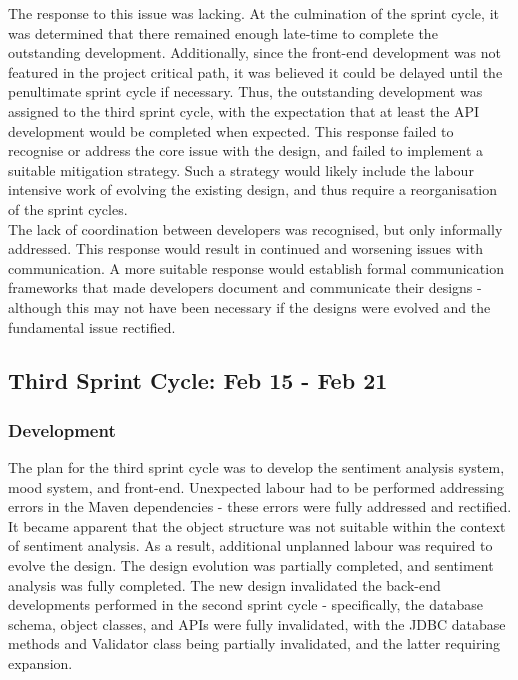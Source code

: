 \documentclass[9pt, titlepage]{extarticle}
\begin{document}
The response to this issue was lacking. At the culmination of the sprint cycle, it was determined that there remained enough late-time to complete the outstanding development. Additionally, since the front-end development was not featured in the project critical path, it was believed it could be delayed until the penultimate sprint cycle if necessary. Thus, the outstanding development was assigned to the third sprint cycle, with the expectation that at least the API development would be completed when expected. This response failed to recognise or address the core issue with the design, and failed to implement a suitable mitigation strategy. Such a strategy would likely include the labour intensive work of evolving the existing design, and thus require a reorganisation of the sprint cycles.\\

The lack of coordination between developers was recognised, but only informally addressed. This response would result in continued and worsening issues with communication. A more suitable response would establish formal communication frameworks that made developers document and communicate their designs - although this may not have been necessary if the designs were evolved and the fundamental issue rectified.

\subsection{Third Sprint Cycle: Feb 15 - Feb 21}

\subsubsection{Development}

The plan for the third sprint cycle was to develop the sentiment analysis system, mood system, and front-end. Unexpected labour had to be performed addressing errors in the Maven dependencies - these errors were fully addressed and rectified. It became apparent that the object structure was not suitable within the context of sentiment analysis. As a result, additional unplanned labour was required to evolve the design. The design evolution was partially completed, and sentiment analysis was fully completed. The new design invalidated the back-end developments performed in the second sprint cycle - specifically, the database schema, object classes, and APIs were fully invalidated, with the JDBC database methods and Validator class being partially invalidated, and the latter requiring expansion.\\
\end{document}
